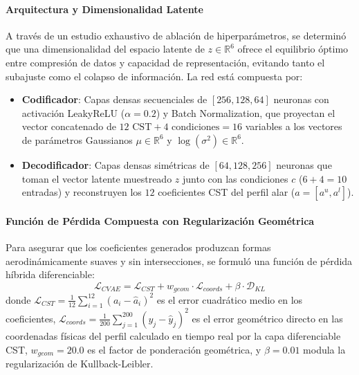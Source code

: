 \paragraph{Arquitectura y Dimensionalidad Latente}
A través de un estudio exhaustivo de ablación de hiperparámetros, se determinó que una dimensionalidad del espacio latente de $z \in \mathbb{R}^6$ ofrece el equilibrio óptimo entre compresión de datos y capacidad de representación, evitando tanto el subajuste como el colapso de información. 
La red está compuesta por:
\begin{itemize}
    \item \textbf{Codificador}: Capas densas secuenciales de $[256, 128, 64]$ neuronas con activación LeakyReLU ($\alpha = 0.2$) y Batch Normalization, que proyectan el vector concatenado de $12\text{ CST} + 4\text{ condiciones} = 16$ variables a los vectores de parámetros Gaussianos $\mu \in \mathbb{R}^6$ y $\log(\sigma^2) \in \mathbb{R}^6$.
    \item \textbf{Decodificador}: Capas densas simétricas de $[64, 128, 256]$ neuronas que toman el vector latente muestreado $z$ junto con las condiciones $c$ ($6 + 4 = 10$ entradas) y reconstruyen los $12$ coeficientes CST del perfil alar ($a = [a^u, a^l]$).
\end{itemize}

\paragraph{Función de Pérdida Compuesta con Regularización Geométrica}
Para asegurar que los coeficientes generados produzcan formas aerodinámicamente suaves y sin intersecciones, se formuló una función de pérdida híbrida diferenciable:
\begin{equation}
    \mathcal{L}_{CVAE} = \mathcal{L}_{CST} + w_{geom} \cdot \mathcal{L}_{coords} + \beta \cdot \mathcal{D}_{KL}
\end{equation}
donde $\mathcal{L}_{CST} = \frac{1}{12} \sum_{i=1}^{12} (a_i - \hat{a}_i)^2$ es el error cuadrático medio en los coeficientes, $\mathcal{L}_{coords} = \frac{1}{200} \sum_{j=1}^{200} (y_j - \hat{y}_j)^2$ es el error geométrico directo en las coordenadas físicas del perfil calculado en tiempo real por la capa diferenciable CST, $w_{geom} = 20.0$ es el factor de ponderación geométrica, y $\beta = 0.01$ modula la regularización de Kullback-Leibler.

